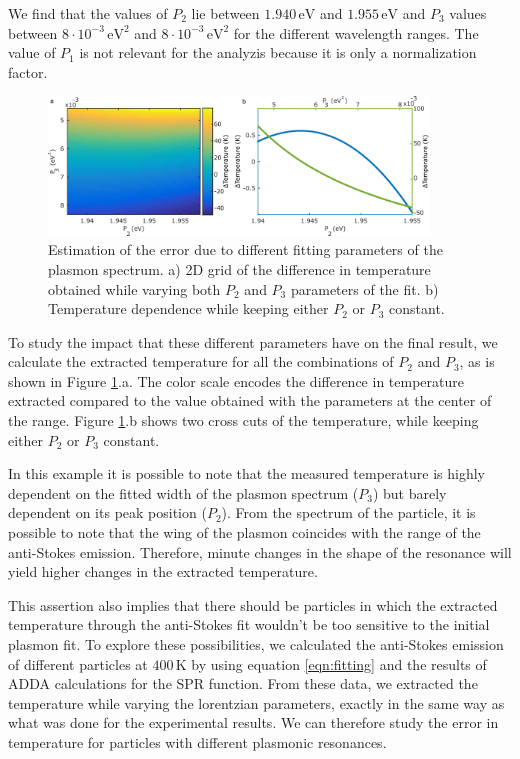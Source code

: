 \documentclass[journal=nalefd,manuscript=letter]{achemso}
\newcommand{\K}{\ensuremath{\,\textrm{K}}}
\newcommand{\eV}{\ensuremath{\,\textrm{eV}}}
\begin{document}
We find that the values of $P_2$ lie between $1.940\eV$ and $1.955\eV$ and $P_3$ values between $8\cdot10^{-3}\eV^2$ and $8\cdot10^{-3}\eV^2$ for the different wavelength ranges. The value of $P_1$ is not relevant for the analyzis because it is only a normalization factor.

\begin{figure}[htp] \centering
\includegraphics[width=0.90\textwidth]{Figures/Supplementary/05_Estimation_error/05_estimation_error.png}
\caption{Estimation of the error due to different fitting parameters of the plasmon spectrum. a) 2D grid of the difference in temperature obtained while varying both $P_2$ and $P_3$ parameters of the fit. b) Temperature dependence while keeping either $P_2$ or $P_3$ constant.}
	\label{fig:estimation-error}
\end{figure}

To study the impact that these different parameters have on the final result, we calculate the extracted temperature for all the combinations of $P_2$ and $P_3$, as is shown in Figure \ref{fig:estimation-error}.a. The color scale encodes the difference in temperature extracted compared to the value obtained with the parameters at the center of the range. Figure \ref{fig:estimation-error}.b shows two cross cuts of the temperature, while keeping either $P_2$ or $P_3$ constant.

In this example it is possible to note that the measured temperature is highly dependent on the fitted width of the plasmon spectrum ($P_3$) but barely dependent on its peak position ($P_2$). From the spectrum of the particle, it is possible to note that the wing of the plasmon coincides with the range of the anti-Stokes emission. Therefore, minute changes in the shape of the resonance will yield higher changes in the extracted temperature.

This assertion also implies that there should be particles in which the extracted temperature through the anti-Stokes fit wouldn't be too sensitive to the initial plasmon fit. To explore these possibilities, we calculated the anti-Stokes emission of different particles at $400\K$ by using equation \ref{eqn:fitting} and the results of ADDA calculations for the SPR function. From these data, we extracted the  temperature while varying the lorentzian parameters, exactly in the same way as what was done for the experimental results. We can therefore study the error in temperature for particles with different plasmonic resonances.
\end{document}
